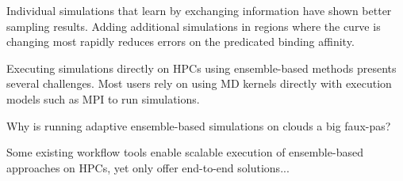 Individual simulations that learn by exchanging information have shown better 
sampling results. Adding additional simulations in regions where the curve is 
changing most rapidly reduces errors on the predicated binding affinity. 

Executing simulations directly on HPCs using ensemble-based methods presents 
several challenges. Most users rely on using MD kernels directly with 
execution models such as MPI to run simulations. 

Why is running adaptive ensemble-based simulations on clouds a big faux-pas?

Some existing workflow tools enable scalable execution of ensemble-based 
approaches on HPCs, yet only offer end-to-end solutions...

